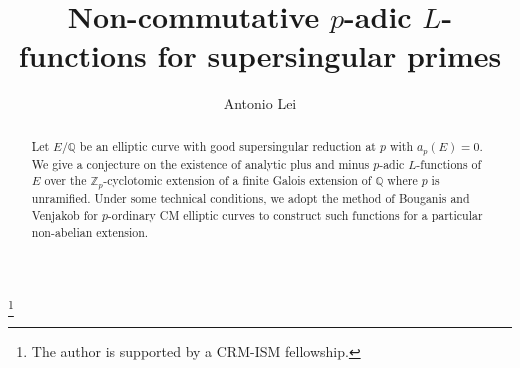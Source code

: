 \documentclass{amsart}
\begin{document}
\title{Non-commutative $p$-adic $L$-functions for supersingular primes}

\author{Antonio Lei}
\address{Department of Mathematics and Statistics\\
Burnside Hall\\
McGill University\\
Montreal QC\\
Canada H3A 0B9}
\thanks{The author is supported by a CRM-ISM fellowship.}

\begin{abstract}
Let $E/{\mathbb Q}$ be an elliptic curve with good supersingular reduction at $p$ with $a_p(E)=0$. We give a conjecture on the existence of analytic plus and minus $p$-adic $L$-functions of $E$ over the ${{\mathbb Z}_p}$-cyclotomic extension of a finite Galois extension of ${\mathbb Q}$ where $p$ is unramified. Under some technical conditions, we adopt the method of Bouganis and Venjakob for $p$-ordinary CM elliptic curves to construct such functions for a particular non-abelian extension. 
\end{abstract}


\maketitle

 
\end{document}
